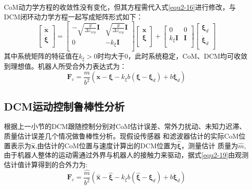         CoM动力学方程的收敛性没有变化，但其方程需代入式\eqref{equ2-16}进行修改，与DCM闭环动力学方程一起写成矩阵形式如下：
        \begin{equation}
            \left[ \begin{array}{c}
                \boldsymbol{\dot{x}}\\
                \boldsymbol{\dot{\xi}}\\
            \end{array} \right] =\left[ \begin{matrix}
                -\sqrt{\frac{g}{\varDelta z_{vrp}}}\boldsymbol{I}&		\sqrt{\frac{g}{\varDelta z_{vrp}}}\boldsymbol{I}\\
                0&		-k_{\xi}\boldsymbol{I}\\
            \end{matrix} \right] \left[ \begin{array}{c}
                \boldsymbol{x}\\
                \boldsymbol{\xi }\\
            \end{array} \right] +\left[ \begin{matrix}
                0&		0\\
                k_{\xi}\boldsymbol{I}&		\boldsymbol{I}\\
            \end{matrix} \right] \left[ \begin{array}{c}
                \boldsymbol{\xi }_d\\
                \boldsymbol{\dot{\xi}}_d\\
            \end{array} \right]
            \label{equ2-18}
        \end{equation}
        其中系统矩阵的特征值在$k_{\xi}>0$时均大于0，此时系统稳定，CoM、DCM均可收敛到理想值。机器人所受合外力表达式为：
        \begin{equation}
            \boldsymbol{F}_c=\frac{m}{b^2}\left( \boldsymbol{x}-\boldsymbol{\xi }-k_{\xi}b\left( \boldsymbol{\xi }-\boldsymbol{\xi }_d \right) +b\boldsymbol{\dot{\xi}}_d \right) 
            \label{equ2-19}
        \end{equation}
    \subsection{DCM运动控制鲁棒性分析}
        根据上一小节的DCM跟随控制分别对CoM估计误差、常外力扰动、未知力迟滞、质量估计误差几个情况做鲁棒性分析。现假设传感器
        和滤波器估计的实际CoM位置表示为$\hat{\boldsymbol{x}}$,由估计的CoM位置与速度计算出的DCM位置为$\hat{\boldsymbol{\xi}}$，测量估计
        质量为$\hat{m}$,由于机器人整体的运动需通过外界与机器人的接触力来驱动，据式\eqref{equ2-19}由观测估计值计算得到的合外力为:
        \begin{equation}
            \boldsymbol{F}_c=\frac{\hat{m}}{b^2}\left( \boldsymbol{\hat{x}}-\boldsymbol{\hat{\xi}}-k_{\xi}b\left( \boldsymbol{\hat{\xi}}-\boldsymbol{\xi }_d \right) +b\boldsymbol{\dot{\xi}}_d \right) 
            \label{equ2-20}
        \end{equation}
